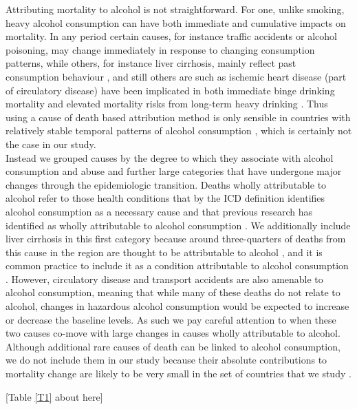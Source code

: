 \documentclass{article}
\begin{document}
\begin{spacing}{1.5}
Attributing mortality to alcohol is not straightforward. For one, unlike smoking, heavy alcohol consumption can have both immediate and cumulative impacts on mortality. In any period certain causes, for instance traffic accidents or alcohol poisoning, may change immediately in response to changing consumption patterns, while others, for instance liver cirrhosis, mainly reflect past consumption behaviour \citep{ menon2001pathogenesis, rehm2003relationship}, and still others are such as ischemic heart disease (part of circulatory disease) have been implicated in both immediate binge drinking mortality \citep{kauhanen1997beer} and elevated mortality risks from long-term heavy drinking \citep{roerecke2014alcohol}. Thus using a cause of death based attribution method is only sensible in countries with relatively stable temporal patterns of alcohol consumption \citep{kraus2015changes,martikainen2014income}, which is certainly not the case in our study. \\

Instead we grouped causes by the degree to which they associate with alcohol consumption and abuse and further large categories that have undergone major changes through the epidemiologic transition.  Deaths wholly attributable to alcohol refer to those health conditions that by the ICD definition identifies alcohol consumption as a necessary cause and that previous research has identified as wholly attributable to alcohol consumption \citep{rehm2010relation}. We additionally include liver cirrhosis in this first category because around three-quarters of deaths from this cause in the region are thought to be attributable to alcohol \citep{rehm2003relationship}, and it is common practice to include it as a condition attributable to alcohol consumption \citep{rehm2003relationship,rehm2010relation}. However, circulatory disease and transport accidents are also amenable to alcohol consumption, meaning that while many of these deaths do not relate to alcohol, changes in hazardous alcohol consumption would be expected to increase or decrease the baseline levels.  As such we pay careful attention to when these two causes co-move with large changes in causes wholly attributable to alcohol. Although additional rare causes of death can be linked to alcohol consumption, we do not include them in our study because their absolute contributions to mortality change are likely to be very small in the set of countries that we study \citep{grigoriev2015}.\\


\begin{center}
[Table \ref{T1} about here]
\end{center}




\end{spacing}
\end{document}
